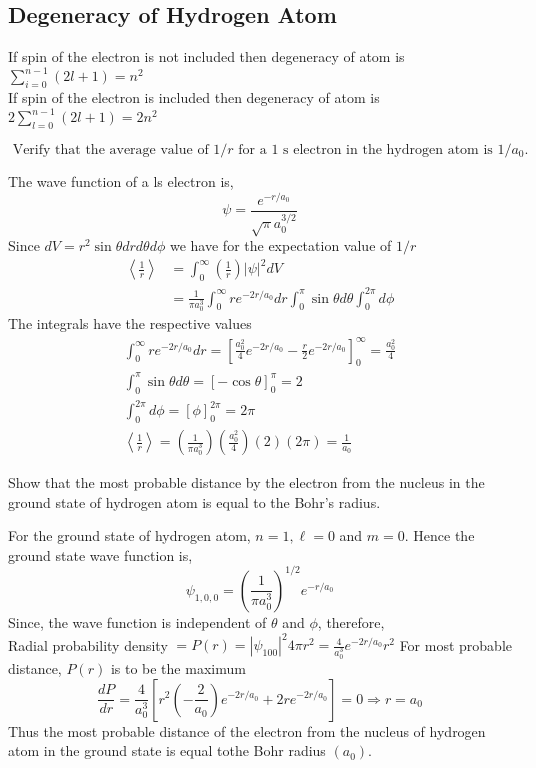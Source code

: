 \subsection{ Degeneracy of Hydrogen Atom}
If spin of the electron is not included then degeneracy of atom is $\sum_{i=0}^{n-1}(2 l+1)=n^{2}$\\
If spin of the electron is included then degeneracy of atom is $2 \sum_{l=0}^{n-1}(2 l+1)=2 n^{2}$

\begin{exercise}
	$\text { Verify that the average value of } 1 / r \text { for a } 1 \text { s electron in the hydrogen atom is } 1 / a_{0} \text {. }$
\end{exercise}
\begin{answer}
The wave function of a ls electron is,
$$
\psi=\frac{e^{-r / a_{0}}}{\sqrt{\pi} a_{0}^{3 / 2}}
$$
Since $d V=r^{2} \sin \theta d r d \theta d \phi$ we have for the expectation value of $1 / r$
$$
\begin{aligned}
\left\langle\frac{1}{r}\right\rangle &=\int_{0}^{\infty}\left(\frac{1}{r}\right)|\psi|^{2} d V \\
&=\frac{1}{\pi a_{0}^{3}} \int_{0}^{\infty} r e^{-2 r / a_{0}} d r \int_{0}^{\pi} \sin \theta d \theta \int_{0}^{2 \pi} d \phi
\end{aligned}
$$
The integrals have the respective values
$$
\begin{gathered}
\int_{0}^{\infty} r e^{-2 r / a_{0}} d r=\left[\frac{a_{0}^{2}}{4} e^{-2 r / a_{0}}-\frac{r}{2} e^{-2 r / a_{0}}\right]_{0}^{\infty}=\frac{a_{0}^{2}}{4} \\
\int_{0}^{\pi} \sin \theta d \theta=[-\cos \theta]_{0}^{\pi}=2 \\
\int_{0}^{2 \pi} d \phi=[\phi]_{0}^{2 \pi}=2 \pi \\
\left\langle\frac{1}{r}\right\rangle=\left(\frac{1}{\pi a_{0}^{3}}\right)\left(\frac{a_{0}^{2}}{4}\right)(2)(2 \pi)=\frac{1}{a_{0}}
\end{gathered}
$$	
\end{answer}
\begin{exercise}
 Show that the most probable distance by the electron from the nucleus in the ground state of hydrogen atom is equal to the Bohr's radius.
\end{exercise}
\begin{answer}
For the ground state of hydrogen atom, $n=1, \ell=0$ and $m=0$. Hence the ground state wave function is,
$$
\psi_{1,0,0}=\left(\frac{1}{\pi a_{0}^{3}}\right)^{1 / 2} e^{-r / a_{0}}
$$
Since, the wave function is independent of $\theta$ and $\phi$, therefore,\\
Radial probability density $=P(r)=\left|\psi_{100}\right|^{2} 4 \pi r^{2}=\frac{4}{a_{0}^{3}} e^{-2 r / a_{0}} r^{2}$
For most probable distance, $P(r)$ is to be the maximum
$$
\frac{d P}{d r}=\frac{4}{a_{0}^{3}}\left[r^{2}\left(-\frac{2}{a_{0}}\right) e^{-2 r / a_{0}}+2 r e^{-2 r / a_{0}}\right]=0 \Rightarrow r=a_{0}
$$
Thus the most probable distance of the electron from the nucleus of hydrogen atom in the ground state is equal tothe Bohr radius $\left(a_{0}\right)$.	
\end{answer}
